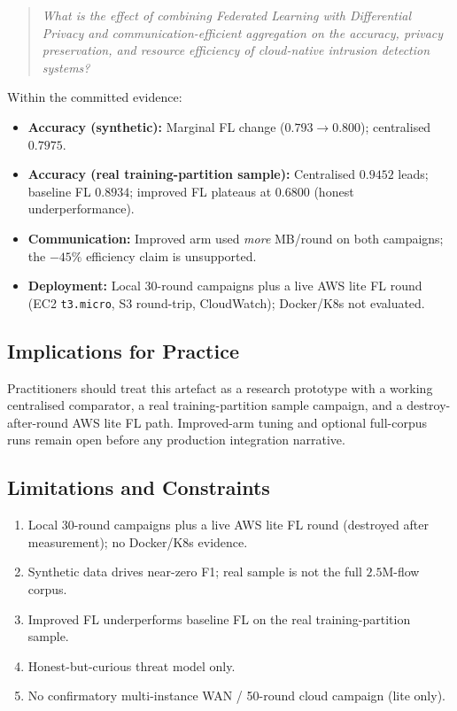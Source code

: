 \begin{quote}
\textit{What is the effect of combining Federated Learning with Differential Privacy and communication-efficient aggregation on the accuracy, privacy preservation, and resource efficiency of cloud-native intrusion detection systems?}
\end{quote}

Within the committed evidence:

\begin{itemize}
    \item \textbf{Accuracy (synthetic):} Marginal FL change ($0.793 \rightarrow 0.800$); centralised $0.7975$.
    \item \textbf{Accuracy (real training-partition sample):} Centralised $0.9452$ leads; baseline FL $0.8934$; improved FL plateaus at $0.6800$ (honest underperformance).
    \item \textbf{Communication:} Improved arm used \emph{more} MB/round on both campaigns; the $-45\%$ efficiency claim is unsupported.
    \item \textbf{Deployment:} Local 30-round campaigns plus a live AWS lite FL round (EC2 \texttt{t3.micro}, S3 round-trip, CloudWatch); Docker/K8s not evaluated.
\end{itemize}

\subsection{Implications for Practice}

Practitioners should treat this artefact as a research prototype with a working centralised comparator, a real training-partition sample campaign, and a destroy-after-round AWS lite FL path. Improved-arm tuning and optional full-corpus runs remain open before any production integration narrative.

\subsection{Limitations and Constraints}

\begin{enumerate}
    \item Local 30-round campaigns plus a live AWS lite FL round (destroyed after measurement); no Docker/K8s evidence.
    \item Synthetic data drives near-zero F1; real sample is not the full $2.5$M-flow corpus.
    \item Improved FL underperforms baseline FL on the real training-partition sample.
    \item Honest-but-curious threat model only.
    \item No confirmatory multi-instance WAN / 50-round cloud campaign (lite only).
\end{enumerate}

